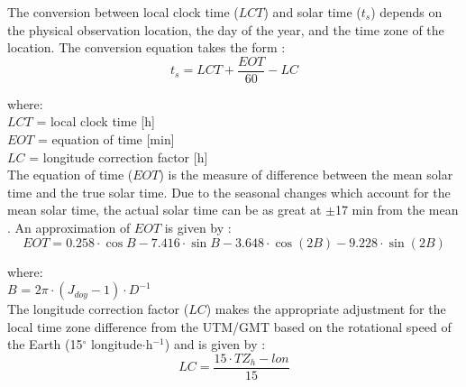 \noindent The conversion between local clock time ($LCT$) and solar time ($t_{s}$) depends on the physical observation location, the day of the year, and the time zone of the location.  
The conversion equation takes the form \parencite[Eq. 3.5]{stine01}:
%
%
\begin{equation}
\label{eq:soltime}
    t_{s} = LCT + \frac{EOT}{60} - LC
\end{equation}

\noindent where: \\
\indent $LCT$ = local clock time [h] \\
\indent $EOT$ = equation of time [min] \\
\indent $LC$ = longitude correction factor [h] \\

\noindent The equation of time ($EOT$) is the measure of difference between the mean solar time and the true solar time.  
Due to the seasonal changes which account for the mean solar time, the actual solar time can be as great at $\pm$17 min from the mean \parencite{stine01}.  
An approximation of $EOT$ is given by \parencite{stine01,woolf68}:
\begin{equation}
\label{eq:eot}
    EOT = 0.258 \cdot \cos B - 7.416 \cdot \sin B - 3.648 \cdot \cos (2B) - 9.228 \cdot \sin (2B)
\end{equation}

\noindent where: \\
\indent $B$ = $2\pi \cdot (J_{doy}-1) \cdot D^{-1}$ \\

\noindent The longitude correction factor ($LC$) makes the appropriate adjustment for the local time zone difference from the UTM/GMT based on the rotational speed of the Earth (15$^{\circ}$ longitude$\cdot$h$^{-1}$) and is given by \parencite{stine01}:
%
\begin{equation}
\label{eq:lc}
    LC = \frac{15 \cdot TZ_{h} - lon}{15}
\end{equation}

